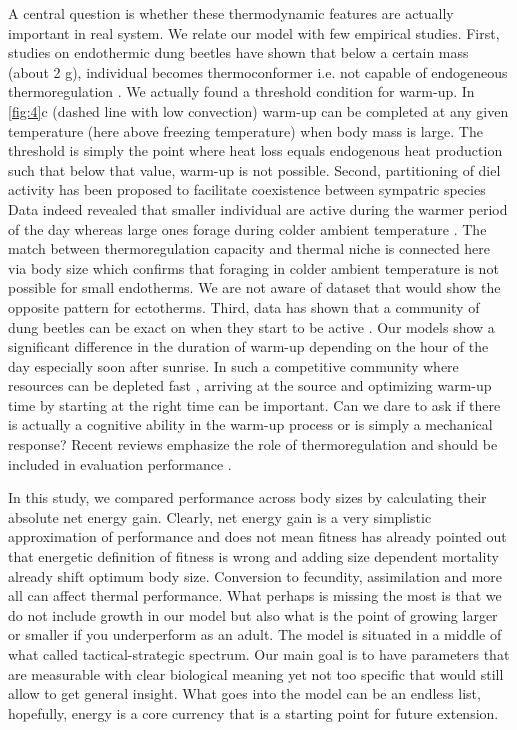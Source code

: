 A central question is whether these thermodynamic features are actually important in real system.  
We relate our model with few empirical studies.
First, studies on endothermic dung beetles have shown that below a certain mass (about 2 g), individual becomes thermoconformer i.e. not capable of endogeneous thermoregulation \citep{Bartholomew1978, Verdu2006}.
We actually found a threshold condition for warm-up.
In \cref{fig:4}c (dashed line with low convection) warm-up can be completed at any given temperature (here above freezing temperature) when body mass is large.
The threshold is simply the point where heat loss equals endogenous heat production such that  below that value, warm-up is not possible.
Second, partitioning of diel activity has been proposed to facilitate coexistence between sympatric species \citep{Viljanen2009}
Data indeed revealed that smaller  individual are active during the warmer period of the day whereas large ones forage during colder ambient temperature \citep{May1985}.
The match between thermoregulation capacity and thermal niche is connected here via body size which confirms that foraging in colder ambient temperature is not possible for small endotherms.
We are not aware of dataset that would show the opposite pattern for ectotherms.
Third, data has shown that a community of dung beetles can be exact on when they start to be active \citep[e.g.,][]{Halffter1966, Caveney1995}.
Our models show a significant difference in the duration of warm-up depending on the hour of the day especially soon after sunrise.
In such a competitive community where resources can be depleted fast \citep{Hanski1991}, arriving at the source and optimizing warm-up time by starting at the right time can be important.
Can we dare to ask if there is actually a cognitive ability in the warm-up process or is simply a mechanical response?
Recent reviews emphasize the role of thermoregulation and should be included in evaluation performance \citep{Dial2008, Kalinkat2015}.


In this study, we compared performance across body sizes by calculating their absolute net energy gain.
Clearly, net energy gain is a very simplistic approximation of performance and does not mean fitness
\citet{Kozlowski1996} has already pointed out that energetic definition of fitness is wrong and adding size dependent mortality already shift optimum body size.
Conversion to fecundity, assimilation and more all can affect thermal performance.
What perhaps is missing the most is that we do not include growth in our model but also what is the point of growing larger or smaller if you underperform as an adult. 
The model is situated in a middle of what \citet{Holling1966} called tactical-strategic spectrum.
Our main goal is to have parameters that are measurable with clear biological meaning yet not too specific that would still allow to get general insight. 
What goes into the model can be an endless list, hopefully, energy is a core currency that is a starting point for future extension.

